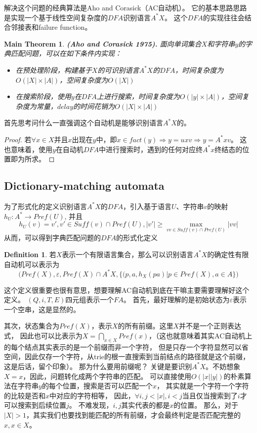 \documentclass[UTF8]{ctexart}
\newtheorem{mthm}[thm]{Main Theorem}
\theoremstyle{definition}
\newtheorem{defn}[thm]{Definition}
\theoremstyle{remark}
\numberwithin{equation}{subsection}
\newcommand\Emph{\textbf}
\begin{document}
	解决这个问题的经典算法是Aho and Corasick（AC自动机）。
	它的基本思路思路是实现一个基于线性空间复杂度的$DFA$识别语言$A^*X$。
	这个$DFA$的实现往往会结合邻接表和failure function。
	
	\begin{mthm}
		\Emph{(Aho and Corasick 1975).} 面向单词集合$X$和字符串$y$的字典匹配问题，可以在如下条件内实现：
		\begin{itemize}
			\item 在预处理阶段，构建基于$X$的可识别语言$A^*X$的$DFA$，时间复杂度为$O(|X|\times|A|)$，空间复杂度为$O(|X|)$
			\item 在搜索阶段，使用$y$在$DFA$上进行搜索，时间复杂度为$O(|y|\times|A|)$，空间复杂度为常量，$delay$的时间花销为$O(|X|\times|A|)$
		\end{itemize}
	\end{mthm}
	
	首先思考问什么一直强调这个自动机是能够识别语言$A^*X$的。
	\begin{proof}
		若$\forall x \in X$并且$x$出现在$y$中，即$x \in fact(y) \Rightarrow y=uxv \Rightarrow y=A^*xv$。
		这也意味着，使用$y$在自动机$DFA$中进行搜索时，遇到的任何对应终$A^*x$终结态的位置即为所求。
	\end{proof}
	
\subsection{Dictionary-matching automata}
	
	为了形式化的定义识别语言$A^*X$的$DFA$，引入基于语言$U$、字符串$v$的映射$h_U: A^* \rightarrow Pref(U) $, 并且
	\[
		h_U(v) = v', v' \in Suff(v) \cap Pref(U), |v'| \ge \max_{vv \in Suff(v)\cap Pref(U)} {|vv|}
	\]
	从而，可以得到字典匹配问题的$DFA$的形式化定义
	\begin{defn}
		若$X$表示一个有限语言集合，那么可以识别语言$A^*X$的确定性有限自动机可以表示为
		\[
			\Big( Pref(X), \varepsilon, Pref(X) \cap A^*X, \{(p,a,h_X(pa) | p \in Pref(X), a \in A\} \Big)
		\]
	\end{defn}
	这个定义很重要也很有意思，想要理解AC自动机到底在干嘛主要需要理解好这个定义。
	$(Q, i, T, E)$四元组表示一个$FA$。
	首先，最好理解的是初始状态为$\varepsilon$表示一个空串，这是显然的。
	
	其次，状态集合为$Pref(X)$，表示$X$的所有前缀。这里$X$并不是一个正则表达式，
	因此也可以比表示为$X = \bigcap_{x \in X} Pref(x)$，（这也就意味着其实AC自动机上的每个结点其实表示的是一个前缀而非一个字符，
	但是只存一个字符显然可以省空间，因此仅存一个字符，从trie的根一直搜索到当前结点的路径就是这个前缀，这是后话，留个印象）。
	那为什么要用前缀呢？
	关键是要识别$A^*X$。不妨想象$X={x}$，因此，问题转化成两个字符串的匹配。
	可以直接使用$O(|x||y|)$的朴素算法在字符串$y$的每个位置，搜索是否可以匹配一个$x$，
	其实就是一个字符一个字符的比较是否和$x$中对应的字符相等，
	因此，$\forall i,j < |x|, i<j$当且仅当搜索到了$i$才可以搜索到后续位置$j$。
	不难发现，$i,j$其实代表的都是$x$的位置。
	那么，对于$|X|>1$，其实我们也要找到能匹配的所有前缀，才会最终判定是否匹配完整的$x, x \in X$。
	
\end{document}
